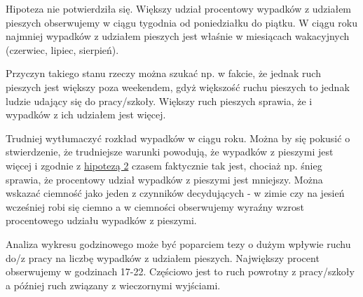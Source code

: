 Hipoteza nie potwierdziła się. Większy udział procentowy wypadków z
udziałem pieszych obserwujemy w ciągu tygodnia od poniedziałku do
piątku. W ciągu roku najmniej wypadków z udziałem pieszych jest właśnie
w miesiącach wakacyjnych (czerwiec, lipiec, sierpień).

Przyczyn takiego stanu rzeczy można szukać np. w fakcie, że jednak ruch
pieszych jest większy poza weekendem, gdyż większość ruchu pieszych to
jednak ludzie udający się do pracy/szkoły. Większy ruch pieszych
sprawia, że i wypadków z ich udziałem jest więcej.

Trudniej wytłumaczyć rozkład wypadków w ciągu roku. Można by się pokusić
o stwierdzenie, że trudniejsze warunki powodują, że wypadków z pieszymi
jest więcej i zgodnie z \href{Hipoteza-2}{hipotezą 2} czasem faktycznie
tak jest, chociaż np. śnieg sprawia, że procentowy udział wypadków z
pieszymi jest mniejszy. Można wskazać ciemność jako jeden z czynników
decydujących - w zimie czy na jesień wcześniej robi się ciemno a w
ciemności obserwujemy wyraźny wzrost procentowego udziału wypadków z
pieszymi.

Analiza wykresu godzinowego może być poparciem tezy o dużym wpływie
ruchu do/z pracy na liczbę wypadków z udziałem pieszych. Największy
procent obserwujemy w godzinach 17-22. Częściowo jest to ruch powrotny z
pracy/szkoły a później ruch związany z wieczornymi wyjściami.
